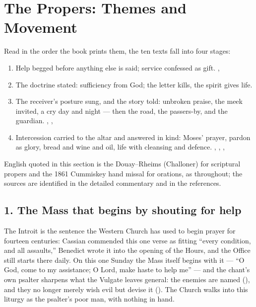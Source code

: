\sectionguard
\section*{The Propers: Themes and Movement}
\label{triptych:brief-synthesis:start}


Read in the order the book prints them, the ten texts fall into four stages:

\begin{enumerate}[leftmargin=1.5em, itemsep=0.1em]
  \item Help begged before anything else is said; service confessed as gift. , 
  \item The doctrine stated: sufficiency from God; the letter kills, the spirit gives life. 
  \item The receiver's posture sung, and the story told: unbroken praise, the meek invited, a cry day and night --- then the road, the passers-by, and the guardian. , , 
  \item Intercession carried to the altar and answered in kind: Moses' prayer, pardon as glory, bread and wine and oil, life with cleansing and defence. , , , 
\end{enumerate}

English quoted in this section is the Douay--Rheims (Challoner) for scriptural
propers and the 1861 Cummiskey hand missal for orations, as throughout; the
sources are identified in the detailed commentary and in the references.

\subsection*{1. The Mass that begins by shouting for help}

The Introit is the sentence the Western Church has used to begin prayer for
fourteen centuries: Cassian commended this one verse as fitting ``every
condition, and all assaults,'' Benedict wrote it into the opening of the
Hours, and the Office still starts there daily. On this one Sunday the Mass
itself begins with it --- ``O God, come to my assistance; O Lord, make haste
to help me'' --- and the chant's own psalter sharpens what the Vulgate leaves
general: the enemies are named (), and they no longer
merely wish evil but devise it (). The Church walks into this
liturgy as the psalter's poor man, with nothing in hand.

